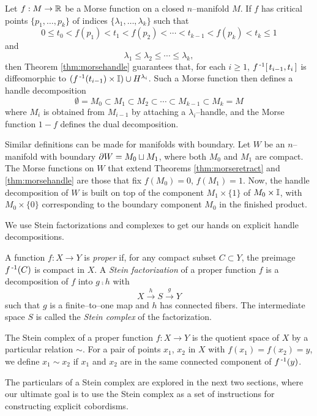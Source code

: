 Let $f:M\to\mathbb{R}$ be a Morse function on a closed $n$--manifold $M$.
If $f$ has critical points $\{p_1,\dots,p_k\}$ of indices $\{\lambda_1,\dots,\lambda_k\}$ such that
\[
	0\leq t_0 < f(p_1) < t_1 < f(p_2) < \cdots < t_{k-1} < f(p_k) < t_k \leq 1
\]
and
\[
	\lambda_1 \leq \lambda_2 \leq \cdots \leq \lambda_k,
\]
then Theorem \ref{thm:morsehandle} guarantees that, for each $i\geq 1$, $f^{\,\text{-}1}[\,t_{i-1},t_i\,]$ is diffeomorphic to $(f^{\,\text{-}1}(t_{i-1})\times\mathbb{I})\cup H^{\lambda_i}$.
Such a Morse function then defines a handle decomposition
\[
	\emptyset = M_0 \subset M_1 \subset M_2 \subset \cdots \subset M_{k-1} \subset M_k = M
\]
where $M_i$ is obtained from $M_{i-1}$ by attaching a $\lambda_i$--handle, and the Morse function $1-f$ defines the dual decomposition.

Similar definitions can be made for manifolds with boundary.
Let $W$ be an $n$--manifold with boundary $\partial W = M_0\sqcup M_1$, where both $M_0$ and $M_1$ are compact.
The Morse functions on $W$ that extend Theorems \ref{thm:morseretract} and \ref{thm:morsehandle} are those that fix $f(M_0)=0$, $f(M_1)=1$.
Now, the handle decomposition of $W$ is built on top of the component $M_1\times\{1\}$ of $M_0\times\mathbb{I}$, with $M_0\times\{0\}$ corresponding to the boundary component $M_0$ in the finished product.

We use Stein factorizations and complexes to get our hands on explicit handle decompositions.

\begin{defn}
	\label{def:stein}
	A function $f:X\to Y$ is \emph{proper} if, for any compact subset $C\subset Y$, the preimage $f^{\,\text{-}1}(C)$ is compact in $X$.
	A \emph{Stein factorization} of a proper function $f$ is a decomposition of $f$ into $g\comp h$ with $$X\overset{h}{\to} S \overset{g}{\to} Y$$ such that $g$ is a finite--to--one map and $h$ has connected fibers.
	The intermediate space $S$ is called the \emph{Stein complex} of the factorization.
\end{defn}

The Stein complex of a proper function $f:X\to Y$ is the quotient space of $X$ by a particular relation $\sim$.
For a pair of points $x_1$, $x_2$ in $X$ with $f(x_1)=f(x_2)=y$, we define $x_1\sim x_2$ if $x_1$ and $x_2$ are in the same connected component of $f^{\,\text{-}1}(y)$.

The particulars of a Stein complex are explored in the next two sections, where our ultimate goal is to use the Stein complex as a set of instructions for constructing explicit cobordisms.
